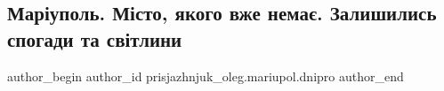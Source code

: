  
 
 
 
 

\subsection{Маріуполь. Місто, якого вже немає. Залишились спогади та світлини}
\label{sec:24_03_2022.fb.prisjazhnjuk_oleg.mariupol.dnipro.1.mar_upol__m_sto__yak}

\ifcmt
 author_begin
   author_id prisjazhnjuk_oleg.mariupol.dnipro
 author_end
\fi
